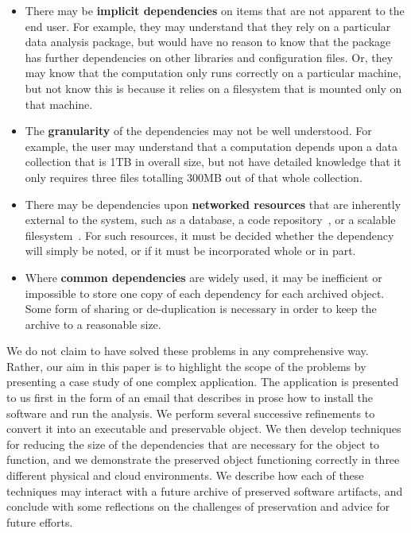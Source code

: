 \documentclass{sig-alternate}
\begin{document}
\begin{itemize}
\item There may be {\bf implicit dependencies} on items that are
not apparent to the end user.  For example, they may understand that
they rely on a particular data analysis package, but would have
no reason to know that the package has further dependencies on
other libraries and configuration files.  Or, they may know that
the computation only runs correctly on a particular machine, but
not know this is because it relies on a filesystem that
is mounted only on that machine.

\item The {\bf granularity} of the dependencies may not be well understood.
For example, the user may understand that a computation depends upon
a data collection that is 1TB in overall size, but not have detailed
knowledge that it only requires three files totalling 300MB out of that
whole collection.

\item There may be dependencies upon {\bf networked resources} that
are inherently external to the system, such as a database, a code
repository~\cite{cms2006cmssw}, or a scalable filesystem~\cite{blomer2011cernvm}.  For such resources, it
must be decided whether the dependency will simply be noted, or if it
must be incorporated whole or in part.

\item Where {\bf common dependencies} are widely used, it may be inefficient or
impossible to store one copy of each dependency for each archived object.
Some form of sharing or de-duplication is necessary in order to keep
the archive to a reasonable size.
\end{itemize}

We do not claim to have solved these problems in any comprehensive
way.  Rather, our aim in this paper is to highlight the scope
of the problems by presenting a case study of one complex application.
The application is presented to us
first in the form of an email that describes in prose how to install
the software and run the analysis.  We perform several successive
refinements to convert it into an executable and preservable object.
We then develop techniques for reducing the size of the dependencies
that are necessary for the object to function, and we demonstrate
the preserved object functioning correctly in three different
physical and cloud environments.
We describe how each of these techniques may interact with
a future archive of preserved software artifacts, and conclude with
some reflections on the challenges of preservation and advice for future efforts.
\end{document}

